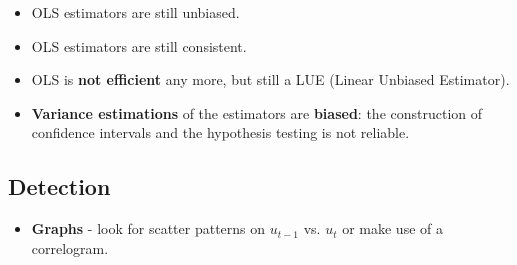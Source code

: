 \documentclass[10pt, a4paper, landscape]{article}
\begin{document}
\begin{multicols}{3}
\begin{itemize}[leftmargin=*]
	\item OLS estimators are still unbiased.
	\item OLS estimators are still consistent.
	\item OLS is \textbf{not efficient} any more, but still a LUE (Linear Unbiased Estimator).
	\item \textbf{Variance estimations} of the estimators are \textbf{biased}: the construction of confidence intervals and the hypothesis testing is not reliable.
\end{itemize}

\subsection*{Detection}

\begin{itemize}[leftmargin=*]
	\item \textbf{Graphs} - look for scatter patterns on \( u_{t - 1} \) vs. \( u_{t} \) or make use of a correlogram.
	

\end{itemize}
\end{multicols}
\end{document}
